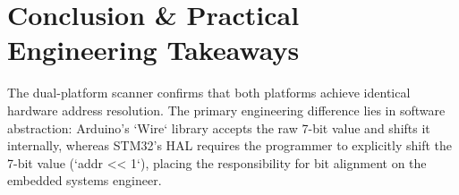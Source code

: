 \documentclass[11pt,a4paper]{article}
\begin{document}
\section{Conclusion \& Practical Engineering Takeaways}
The dual-platform scanner confirms that both platforms achieve identical hardware address resolution. The primary engineering difference lies in software abstraction: Arduino's `Wire` library accepts the raw 7-bit value and shifts it internally, whereas STM32's HAL requires the programmer to explicitly shift the 7-bit value (`addr << 1`), placing the responsibility for bit alignment on the embedded systems engineer.
\end{document}
